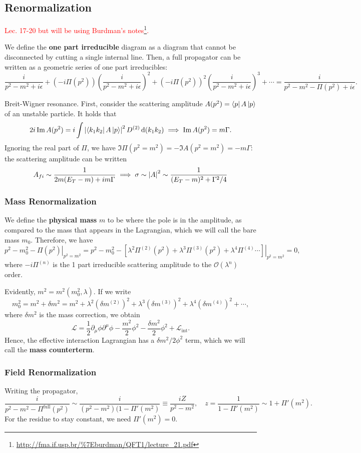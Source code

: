 \documentclass{article}
\begin{document}
\subsection{Renormalization}
\textcolor{red}{Lec. 17-20 but will be using Burdman's notes\footnote{\url{http://fma.if.usp.br/\%7Eburdman/QFT1/lecture_21.pdf}}.}



We define the \textbf{one part irreducible} diagram as a diagram that cannot be disconnected by cutting a single internal line. Then, a full propagator can be written as a geometric series of one part irreducibles:
$$\frac i{p^2-m^2+i\epsilon}+(-i\Pi(p^2))\left(\frac i{p^2-m^2+i\epsilon}\right)^2+(-i\Pi(p^2))^2\left(\frac i{p^2-m^2+i\epsilon}\right)^3+\cdots=\frac i{p^2-m^2-\Pi(p^2)+i\epsilon}.$$

\example Breit-Wigner resonance. First, consider the scattering amplitude $A(p^2)=\bra pA\ket p$ of an unstable particle. It holds that 
$$2i\Im A(p^2)=i\int\left\lvert\bra{k_1k_2}A\ket p\right\rvert^2 D^{(2)}\dd(k_1k_2)\implies \Im A(p^2)=m\Gamma.$$ 
Ignoring the real part of $\Pi$, we have $\Im\Pi(p^2=m^2)=-\Im A(p^2=m^2)=-m\Gamma$: the scattering amplitude can be written 
$$A_{fi}\sim \frac 1{2m(E_T-m)+im\Gamma}\implies\sigma\sim\left\lvert A\right\rvert^2\sim\frac 1{(E_T-m)^2+\Gamma^2/4}$$

\subsubsection{Mass Renormalization}
We define the \textbf{physical mass} $m$ to be where the pole is in the amplitude, as compared to the mass that appears in the Lagrangian, which we will call the bare mass $m_0$. Therefore, we have 
$$p^2-m_0^2-\left.\Pi(p^2)\right|_{p^2=m^2}=p^2-m_0^2-\left.\left[\lambda^2\Pi^{(2)}(p^2)+\lambda^3\Pi^{(3)}(p^2)+\lambda^4\Pi^{(4)}\cdots\right]\right|_{p^2=m^2}=0,$$
where $-i\Pi^{(n)}$ is the 1 part irreducible scattering amplitude to the $\mathcal O(\lambda^n)$ order.

Evidently, $m^2=m^2(m_0^2,\lambda)$. If we write 
$$m_0^2=m^2+\delta m^2=m^2+\lambda^2(\delta m^{(2)})^2+\lambda^3(\delta m^{(3)})^2+\lambda^4(\delta m^{(4)})^2+\cdots,$$
where $\delta m^2$ is the mass correction, we obtain 
$$\mathcal L=\frac 12\partial_\mu\phi\partial^\mu\phi-\frac{m^2}2\phi^2-\frac{\delta m^2}2\phi^2+\mathcal L_\text{int}.$$
Hence, the effective interaction Lagrangian has a $\delta m^2/2\phi^2$ term, which we will call the \textbf{mass counterterm}. 

\subsubsection{Field Renormalization}
Writing the propagator,
$$\frac i{p^2-m^2-\Pi^\text{full}(p^2)}\sim\frac i{(p^2-m^2)(1-\Pi'(m^2)}\equiv \frac{iZ}{p^2-m^2},\quad z=\frac{1}{1-\Pi'(m^2)}\sim 1+\Pi'(m^2).$$
For the residue to stay constant, we need $\Pi'(m^2)=0$.
\end{document}
